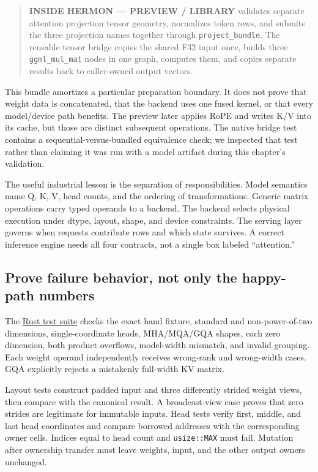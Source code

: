\documentclass[
  10pt,
]{article}
\begin{document}
\begin{quote}
\textbf{INSIDE HERMON --- PREVIEW / LIBRARY}
\texttt{} validates separate attention
projection tensor geometry, normalizes token rows, and submits the three
projection names together through \texttt{project\_bundle}. The reusable
tensor bridge copies the shared F32 input once, builds three
\texttt{ggml\_mul\_mat} nodes in one graph, computes them, and copies
separate results back to caller-owned output vectors.
\end{quote}

This bundle amortizes a particular preparation boundary. It does not
prove that weight data is concatenated, that the backend uses one fused
kernel, or that every model/device path benefits. The preview later
applies RoPE and writes K/V into its cache, but those are distinct
subsequent operations. The native bridge test contains a
sequential-versus-bundled equivalence check; we inspected that test
rather than claiming it was run with a model artifact during this
chapter's validation.

The useful industrial lesson is the separation of responsibilities.
Model semantics name Q, K, V, head counts, and the ordering of
transformations. Generic matrix operations carry typed operands to a
backend. The backend selects physical execution under dtype, layout,
shape, and device constraints. The serving layer governs when requests
contribute rows and which state survives. A correct inference engine
needs all four contracts, not a single box labeled ``attention.''

\subsection{Prove failure behavior, not only the happy-path
numbers}\label{prove-failure-behavior-not-only-the-happy-path-numbers}

The
\href{https://github.com/hermonai/inside-the-llm-engine/blob/astra-visual-rewrite/code/mini-engine/crates/engine0/tests/qkv.rs}{Rust
test suite} checks the exact hand fixture, standard and non-power-of-two
dimensions, single-coordinate heads, MHA/MQA/GQA shapes, each zero
dimension, both product overflows, model-width mismatch, and invalid
grouping. Each weight operand independently receives wrong-rank and
wrong-width cases. GQA explicitly rejects a mistakenly full-width KV
matrix.

Layout tests construct padded input and three differently strided weight
views, then compare with the canonical result. A broadcast-view case
proves that zero strides are legitimate for immutable inputs. Head tests
verify first, middle, and last head coordinates and compare borrowed
addresses with the corresponding owner cells. Indices equal to head
count and \texttt{usize::MAX} must fail. Mutation after ownership
transfer must leave weights, input, and the other output owners
unchanged.
\end{document}
